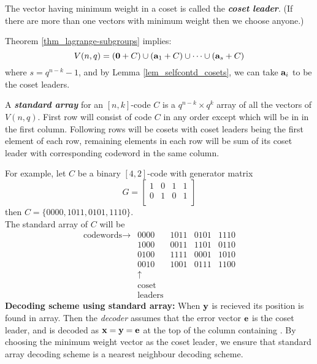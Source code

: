 \documentclass[../main.tex]{subfiles}
\newcommand{\coset}[1]{\code{#1}+C}
\begin{document}
\begin{defn}
	The vector having minimum weight in a coset is called the \textbf{\emph{coset leader}}. (If there are more than one vectors with minimum weight then we choose anyone.)
\end{defn}

Theorem \ref{thm_lagrange-subgroups} implies:
\[
	V(n,q)=(\coset{0})\cup (\code{a}_1+C)\cup \cdots \cup (\code{a}_s+C)
\]
where $s=q^{n-k}-1$, and by Lemma \ref{lem_selfcontd_cosets}, we can take $\textbf{a}_i$ to be the coset leaders.\\
\begin{defn}
	A \textbf{\emph{standard array}} for an $[n,k]$-code $C$ is a $q^{n-k}\times q^k$ array of all the vectors of $V(n,q)$. First row will consist of code $C$ in any order except  which will be in in the first column. Following rows will be cosets with coset leaders being the first element of each row, remaining elements in each row will be sum of its coset leader with corresponding codeword in the same column. 
\end{defn}
For example, let $C$ be a binary $[4,2]$-code with generator matrix 
\[
	G = \begin{bmatrix}
		1 & 0 & 1 & 1\\
		0 & 1 & 0 & 1\\
	\end{bmatrix}
\]
then $C=\{0000,1011,0101,1110\}$.\\
The standard array of $C$ will be
\[
	\begin{matrix}
		\text{codewords}\rightarrow & 0000 & 1011 & 0101 & 1110\\
									& 1000 & 0011 & 1101 & 0110\\
									& 0100 & 1111 & 0001 & 1010\\
									& 0010 & 1001 & 0111 & 1100\\
									& \uparrow\\
									&\text{coset}\\
									&\text{leaders}
 	\end{matrix}
\]
\textbf{Decoding scheme using standard array:} When $\textbf{y}$ is recieved its position is found in array. Then the \emph{decoder} assumes that the error vector $\textbf{e}$ is the coset leader, and  is decoded as $\textbf{x}=\textbf{y}=\textbf{e}$ at the top of the column containing . By choosing the minimum weight vector as the coset leader, we ensure that standard array decoding scheme is a nearest neighbour decoding scheme.
\end{document}
